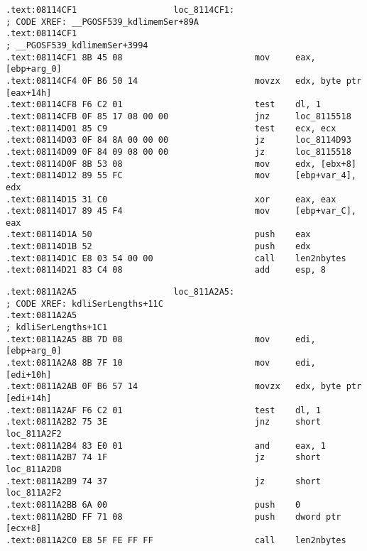 \documentclass[11pt,a4paper,oneside]{book}
\begin{document}
\begin{lstlisting}[caption=\IFRU{kdli.o из}{kdli.o from} libserver11.a]
.text:08114CF1                   loc_8114CF1:                            ; CODE XREF: __PGOSF539_kdlimemSer+89A
.text:08114CF1                                                           ; __PGOSF539_kdlimemSer+3994
.text:08114CF1 8B 45 08                          mov     eax, [ebp+arg_0]
.text:08114CF4 0F B6 50 14                       movzx   edx, byte ptr [eax+14h]
.text:08114CF8 F6 C2 01                          test    dl, 1
.text:08114CFB 0F 85 17 08 00 00                 jnz     loc_8115518
.text:08114D01 85 C9                             test    ecx, ecx
.text:08114D03 0F 84 8A 00 00 00                 jz      loc_8114D93
.text:08114D09 0F 84 09 08 00 00                 jz      loc_8115518
.text:08114D0F 8B 53 08                          mov     edx, [ebx+8]
.text:08114D12 89 55 FC                          mov     [ebp+var_4], edx
.text:08114D15 31 C0                             xor     eax, eax
.text:08114D17 89 45 F4                          mov     [ebp+var_C], eax
.text:08114D1A 50                                push    eax
.text:08114D1B 52                                push    edx
.text:08114D1C E8 03 54 00 00                    call    len2nbytes
.text:08114D21 83 C4 08                          add     esp, 8
\end{lstlisting}

\begin{lstlisting}[caption=\IFRU{оттуда же}{from the same code}]
.text:0811A2A5                   loc_811A2A5:                            ; CODE XREF: kdliSerLengths+11C
.text:0811A2A5                                                           ; kdliSerLengths+1C1
.text:0811A2A5 8B 7D 08                          mov     edi, [ebp+arg_0]
.text:0811A2A8 8B 7F 10                          mov     edi, [edi+10h]
.text:0811A2AB 0F B6 57 14                       movzx   edx, byte ptr [edi+14h]
.text:0811A2AF F6 C2 01                          test    dl, 1
.text:0811A2B2 75 3E                             jnz     short loc_811A2F2
.text:0811A2B4 83 E0 01                          and     eax, 1
.text:0811A2B7 74 1F                             jz      short loc_811A2D8
.text:0811A2B9 74 37                             jz      short loc_811A2F2
.text:0811A2BB 6A 00                             push    0
.text:0811A2BD FF 71 08                          push    dword ptr [ecx+8]
.text:0811A2C0 E8 5F FE FF FF                    call    len2nbytes
\end{lstlisting}
\end{document}
